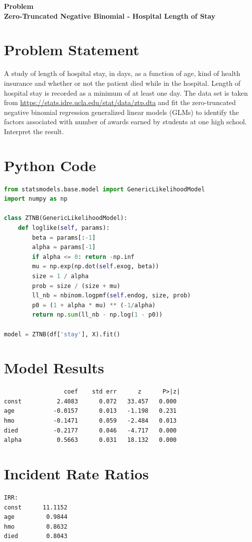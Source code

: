 \documentclass[12pt, a4paper]{article}
\newcounter{problemcounter}
\newcommand{\problemtitle}[1]{%
    \vspace{0.5cm}
    \begin{center}
        \colorbox{DeepGold!20}{\parbox{0.85\textwidth}{\centering
            {\color{RoyalNavy}\Huge\bfseries Problem \arabic{problemcounter}}\\[0.2cm]
            {\color{Charcoal}\large\bfseries #1}
        }}
    \end{center}
    \stepcounter{problemcounter}
    \vspace{0.3cm}
}
\begin{document}
\newpage
\problemtitle{Zero-Truncated Negative Binomial - Hospital Length of Stay}
\section{Problem Statement}A study of length of hospital stay, in days, as a function of age, kind of health insurance and whether or not the patient died while in the hospital. Length of hospital stay is recorded as a minimum of at least one day. The data set is taken from \url{https://stats.idre.ucla.edu/stat/data/ztp.dta} and fit the zero-truncated negative binomial regression generalized linear models (GLMs) to identify the factors associated with number of awards earned by students at one high school. Interpret the result.
\section*{Python Code}
\begin{lstlisting}[language=Python]
from statsmodels.base.model import GenericLikelihoodModel
import numpy as np

class ZTNB(GenericLikelihoodModel):
    def loglike(self, params):
        beta = params[:-1]
        alpha = params[-1]
        if alpha <= 0: return -np.inf
        mu = np.exp(np.dot(self.exog, beta))
        size = 1 / alpha
        prob = size / (size + mu)
        ll_nb = nbinom.logpmf(self.endog, size, prob)
        p0 = (1 + alpha * mu) ** (-1/alpha)
        return np.sum(ll_nb - np.log(1 - p0))

model = ZTNB(df['stay'], X).fit()
\end{lstlisting}

\section*{Model Results}
\begin{outputbox}
\begin{verbatim}
                 coef    std err      z      P>|z|
const          2.4083      0.072   33.457   0.000
age           -0.0157      0.013   -1.198   0.231
hmo           -0.1471      0.059   -2.484   0.013
died          -0.2177      0.046   -4.717   0.000
alpha          0.5663      0.031   18.132   0.000
\end{verbatim}
\end{outputbox}

\section*{Incident Rate Ratios}
\begin{outputbox}
\begin{verbatim}
IRR:
const      11.1152
age         0.9844
hmo         0.8632
died        0.8043
\end{verbatim}
\end{outputbox}
\end{document}
